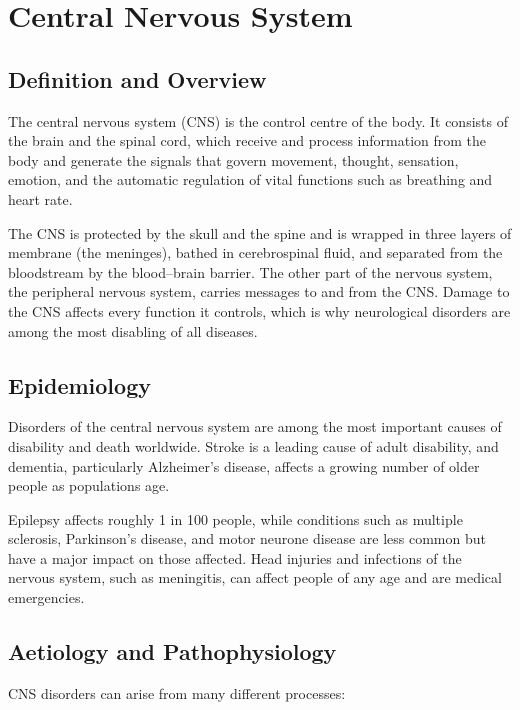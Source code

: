 \chapter{Central Nervous System}

\section*{Definition and Overview}
The central nervous system (CNS) is the control centre of the body. It consists of the brain and the spinal cord, which receive and process information from the body and generate the signals that govern movement, thought, sensation, emotion, and the automatic regulation of vital functions such as breathing and heart rate.

The CNS is protected by the skull and the spine and is wrapped in three layers of membrane (the meninges), bathed in cerebrospinal fluid, and separated from the bloodstream by the blood--brain barrier. The other part of the nervous system, the peripheral nervous system, carries messages to and from the CNS. Damage to the CNS affects every function it controls, which is why neurological disorders are among the most disabling of all diseases.

\section*{Epidemiology}
Disorders of the central nervous system are among the most important causes of disability and death worldwide. Stroke is a leading cause of adult disability, and dementia, particularly Alzheimer's disease, affects a growing number of older people as populations age.

Epilepsy affects roughly 1 in 100 people, while conditions such as multiple sclerosis, Parkinson's disease, and motor neurone disease are less common but have a major impact on those affected. Head injuries and infections of the nervous system, such as meningitis, can affect people of any age and are medical emergencies.

\section*{Aetiology and Pathophysiology}
CNS disorders can arise from many different processes:

